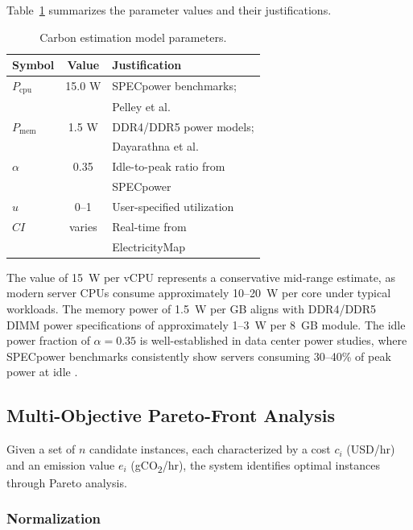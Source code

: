 \documentclass[12pt]{article}
\begin{document}
Table~\ref{tab:params} summarizes the parameter values and their justifications.

\begin{table}[htbp]
\centering
\caption{Carbon estimation model parameters.}
\label{tab:params}
\small
\begin{tabular}{lcl}
\toprule
\textbf{Symbol} & \textbf{Value} & \textbf{Justification} \\
\midrule
$P_{\text{cpu}}$ & 15.0 W & SPECpower benchmarks; \\
                  &        & Pelley et al. \citep{b10} \\
$P_{\text{mem}}$ & 1.5 W  & DDR4/DDR5 power models; \\
                  &        & Dayarathna et al. \citep{b11} \\
$\alpha$          & 0.35   & Idle-to-peak ratio from \\
                  &        & SPECpower \citep{b12} \\
$u$               & 0--1   & User-specified utilization \\
$CI$              & varies & Real-time from \\
                  &        & ElectricityMap \citep{b9} \\
\bottomrule
\end{tabular}
\end{table}

The value of 15~W per vCPU represents a conservative mid-range estimate, as modern server CPUs consume approximately 10--20~W per core under typical workloads. The memory power of 1.5~W per GB aligns with DDR4/DDR5 DIMM power specifications of approximately 1--3~W per 8~GB module. The idle power fraction of $\alpha = 0.35$ is well-established in data center power studies, where SPECpower benchmarks consistently show servers consuming 30--40\% of peak power at idle \citep{b12}.

\subsection{Multi-Objective Pareto-Front Analysis}

Given a set of $n$ candidate instances, each characterized by a cost $c_i$ (USD/hr) and an emission value $e_i$ (gCO\textsubscript{2}/hr), the system identifies optimal instances through Pareto analysis.

\subsubsection{Normalization}
\end{document}
